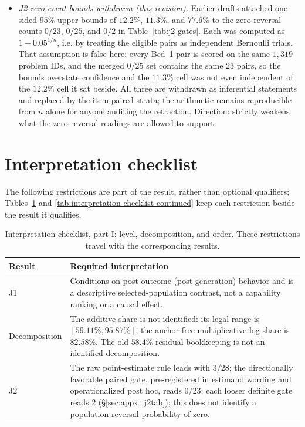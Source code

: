 \documentclass{article}
\begin{document}
\begin{itemize}
  \item \emph{J2 zero-event bounds withdrawn (this revision).}  Earlier drafts
        attached one-sided $95\%$ upper bounds of $12.2\%$, $11.3\%$, and
        $77.6\%$ to the zero-reversal counts $0/23$, $0/25$, and $0/2$ in
        Table~\ref{tab:j2-gates}.  Each was computed as
        $1-0.05^{1/n}$, i.e. by treating the eligible pairs as independent
        Bernoulli trials.  That assumption is false here: every Bed~1 pair is
        scored on the same $1{,}319$ problem IDs, and the merged $0/25$ set
        contains the same $23$ pairs, so the bounds overstate confidence and
        the $11.3\%$ cell was not even independent of the $12.2\%$ cell it sat
        beside.  All three are withdrawn as inferential statements and replaced
        by the item-paired strata; the arithmetic remains reproducible from
        $n$ alone for anyone auditing the retraction.  Direction: strictly
        weakens what the zero-reversal readings are allowed to support.
\end{itemize}

\section{Interpretation checklist}

The following restrictions are part of the result, rather than optional
qualifiers; Tables~\ref{tab:interpretation-checklist} and
\ref{tab:interpretation-checklist-continued} keep each restriction beside the
result it qualifies.

\begin{table}[H]
\centering\small
\setlength{\tabcolsep}{4pt}
\renewcommand{\arraystretch}{1.08}
\begin{tabular}{@{}>{\raggedright\arraybackslash}p{2.1cm}
                    >{\raggedright\arraybackslash}p{11.0cm}@{}}
\toprule
Result & Required interpretation \\
\midrule
J1 & Conditions on post-outcome (post-generation) behavior and is a
descriptive selected-population contrast, not a capability ranking or a
causal effect. \\
Decomposition & The additive share is not identified: its legal range is
$[59.11\%,95.87\%]$; the anchor-free multiplicative log share is $82.58\%$.
The old $58.4\%$ residual bookkeeping is not an identified decomposition. \\
J2 & The raw point-estimate rule leads with $3/28$; the directionally favorable
paired gate, pre-registered in estimand wording and operationalized post hoc,
reads $0/23$; each looser definite gate
reads $2$ (\S\ref{sec:appx_j2tab}); this does not identify a population
reversal probability of zero. \\
\bottomrule
\end{tabular}
\caption{Interpretation checklist, part I: level, decomposition, and order.
These restrictions travel with the corresponding results.}
\label{tab:interpretation-checklist}
\end{table}
\end{document}
